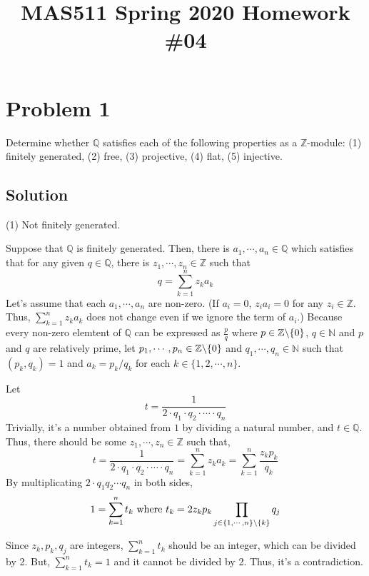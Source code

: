 \documentclass{article}
\title{MAS511 Spring 2020 Homework \#04}
\author{}
\newcommand{\bs}{\char`\\}
\newcommand{\bbN}{\mathbb{N}}
\newcommand{\bbQ}{\mathbb{Q}}
\newcommand{\bbZ}{\mathbb{Z}}
\begin{document}
\maketitle

\section*{Problem 1}

Determine whether \(\bbQ\) satisfies each of the following properties as a \(\bbZ\)-module:
(1) finitely generated,
(2) free,
(3) projective,
(4) flat,
(5) injective.

\subsection*{Solution}

(1) Not finitely generated.

Suppose that \(\bbQ\) is finitely generated. Then, there is \(a_1, \cdots, a_n \in \bbQ\) which satisfies that for any given \(q \in \bbQ\), there is \(z_1, \cdots, z_n \in \bbZ\) such that
\[q = \sum_{k=1}^n z_k a_k\]
Let's assume that each \(a_1, \cdots, a_n\) are non-zero.
(If \(a_i = 0\), \(z_i a_i = 0\) for any \(z_i \in \bbZ\). Thus, \(\sum_{k=1}^n z_k a_k\) does not change even if we ignore the term of \(a_i\).)
Because every non-zero elemtent of \(\bbQ\) can be expressed as \(\frac{p}{q}\) where \(p \in \bbZ\bs\{0\}\), \(q \in \bbN\) and \(p\) and \(q\) are relatively prime, let \(p_1, \cdots, p_n \in \bbZ\bs\{0\}\) and \(q_1, \cdots, q_n \in \bbN\) such that \((p_k, q_k) = 1\) and \(a_k = p_k/q_k\) for each \(k \in \{1, 2, \cdots, n\}\).

Let \[t = \frac{1}{2 \cdot q_1 \cdot q_2 \cdot \cdots \cdot q_n}\]
Trivially, it's a number obtained from \(1\) by dividing a natural number, and \(t \in \bbQ\).
Thus, there should be some \(z_1, \cdots, z_n \in \bbZ\) such that,
\[t
  = \frac{1}{2 \cdot q_1 \cdot q_2 \cdot \cdots \cdot q_n}
  = \sum_{k=1}^n z_k a_k
  = \sum_{k=1}^n \frac{z_k p_k}{q_k}
\]
By multiplicating \(2 \cdot q_1 q_2 \cdots q_n\) in both sides,
\[1 = \sum_{k=1}^{n} t_k \text{  where } t_k = 2 z_k p_k \prod_{j \in \{1, \cdots, n\} \bs \{k\}} q_j\]

Since \(z_k, p_k, q_j\) are integers, \(\sum_{k=1}^{n} t_k\) should be an integer, which can be divided by 2. But, \(\sum_{k=1}^{n} t_k = 1\) and it cannot be divided by 2. Thus, it's a contradiction.
\end{document}
